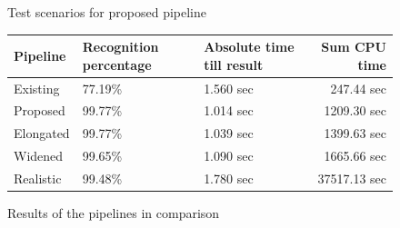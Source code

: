 \begin{figure}[ht]	
	\centering
	
	\caption{Test scenarios for proposed pipeline}
	\label{pic:eval_p3_5_diag}
\end{figure}

\begin{figure}[ht]
	\begin{tabular}{ | l | p{} | p{} | r|}
		\hline
		Pipeline 	& Recognition percentage & Absolute time till result & Sum CPU time \\ \hline
		Existing 	& 77.19\% & 1.560 sec &   247.44 sec \\ \hline
		Proposed 	& 99.77\% & 1.014 sec &  1209.30 sec \\ \hline
		Elongated 	& 99.77\% & 1.039 sec &  1399.63 sec \\ \hline
		Widened 	& 99.65\% & 1.090 sec &  1665.66 sec \\ \hline
		Realistic 	& 99.48\% & 1.780 sec & 37517.13 sec \\ \hline
	\end{tabular}
	\caption{Results of the pipelines in comparison}
	\label{table:eval_dataset_results}
\end{figure}

